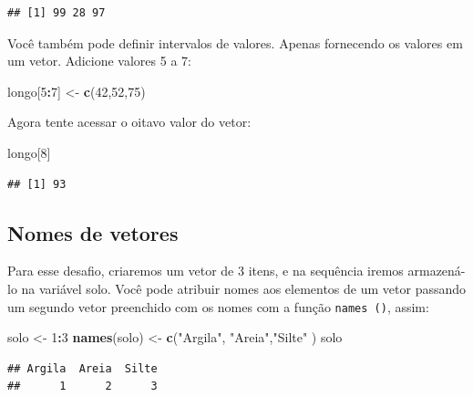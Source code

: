 \documentclass[
]{book}
\newenvironment{Shaded}{\begin{snugshade}}{\end{snugshade}}
\newcommand{\DecValTok}[1]{\textcolor[rgb]{0.00,0.00,0.81}{#1}}
\newcommand{\KeywordTok}[1]{\textcolor[rgb]{0.13,0.29,0.53}{\textbf{#1}}}
\newcommand{\NormalTok}[1]{#1}
\newcommand{\OperatorTok}[1]{\textcolor[rgb]{0.81,0.36,0.00}{\textbf{#1}}}
\newcommand{\StringTok}[1]{\textcolor[rgb]{0.31,0.60,0.02}{#1}}
\begin{document}
\begin{verbatim}
## [1] 99 28 97
\end{verbatim}

Você também pode definir intervalos de valores. Apenas fornecendo os valores em um vetor. Adicione valores 5 a 7:

\begin{Shaded}
\begin{Highlighting}[]
\NormalTok{longo[}\DecValTok{5}\OperatorTok{:}\DecValTok{7}\NormalTok{] <-}\StringTok{ }\KeywordTok{c}\NormalTok{(}\DecValTok{42}\NormalTok{,}\DecValTok{52}\NormalTok{,}\DecValTok{75}\NormalTok{)}
\end{Highlighting}
\end{Shaded}

Agora tente acessar o oitavo valor do vetor:

\begin{Shaded}
\begin{Highlighting}[]
\NormalTok{longo[}\DecValTok{8}\NormalTok{]}
\end{Highlighting}
\end{Shaded}

\begin{verbatim}
## [1] 93
\end{verbatim}

\hypertarget{nomes-de-vetores}{%
\subsection{Nomes de vetores}\label{nomes-de-vetores}}

Para esse desafio, criaremos um vetor de 3 itens, e na sequência iremos armazená-lo na variável solo.
Você pode atribuir nomes aos elementos de um vetor passando um segundo vetor preenchido com os nomes com a função \texttt{names\ ()}, assim:

\begin{Shaded}
\begin{Highlighting}[]
\NormalTok{solo <-}\StringTok{ }\DecValTok{1}\OperatorTok{:}\DecValTok{3}
\KeywordTok{names}\NormalTok{(solo) <-}\StringTok{ }\KeywordTok{c}\NormalTok{(}\StringTok{"Argila"}\NormalTok{, }\StringTok{"Areia"}\NormalTok{,}\StringTok{"Silte"}\NormalTok{ )}
\NormalTok{solo}
\end{Highlighting}
\end{Shaded}

\begin{verbatim}
## Argila  Areia  Silte 
##      1      2      3
\end{verbatim}
\end{document}
